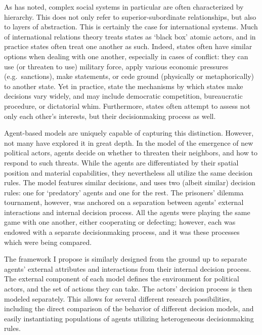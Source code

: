As \citet{simon_1996} has noted, complex social systems in particular are often characterized by hierarchy. This does not only refer to superior-subordinate relationships, but also to layers of abstraction. This is certainly the case for international systems. Much of international relations theory treats states as `black box' atomic actors, and in practice states often treat one another as such. Indeed, states often have similar options when dealing with one another, especially in cases of conflict: they can use (or threaten to use) military force, apply various economic pressures (e.g.~sanctions), make statements, or cede ground (physically or metaphorically) to another state. Yet in practice, state the mechanisms by which states make decisions vary widely, and may include democratic competition, bureaucratic procedure, or dictatorial whim. Furthermore, states often attempt to assess not only each other's interests, but their decisionmaking process as well.

Agent-based models are uniquely capable of capturing this distinction. However, not many have explored it in great depth. In the \citet{axelrod_1997} model of the emergence of new political actors, agents decide on whether to threaten their neighbors, and how to respond to such threats. While the agents are differentiated by their spatial position and material capabilities, they nevertheless all utilize the same decision rules. The \citet{cederman_1997} model features similar decisions, and uses two (albeit similar) decision rules: one for `predatory' agents and one for the rest. The \citet{axelrod_1980} prisoners' dilemma tournament, however, was anchored on a separation between agents' external interactions and internal decision process. All the agents were playing the same game with one another, either cooperating or defecting; however, each was endowed with a separate decisionmaking process, and it was these processes which were being compared.

The framework I propose is similarly designed from the ground up to separate agents' external attributes and interactions from their internal decision process. The external component of each model defines the environment for political actors, and the set of actions they can take. The actors' decision process is then modeled separately. This allows for several different research possibilities, including the direct comparison of the behavior of different decision models, and easily instantiating populations of agents utilizing heterogeneous decisionmaking rules.

